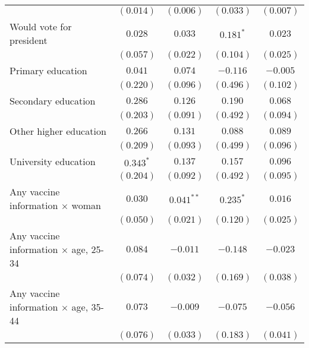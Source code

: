 \begin{table}
\begin{center}
\begin{tabular}{l c c c c}
                                                          & $(0.014)$    & $(0.006)$    & $(0.033)$     & $(0.007)$ \\
Would vote for president                                  & $0.028$      & $0.033$      & $0.181^{*}$   & $0.023$   \\
                                                          & $(0.057)$    & $(0.022)$    & $(0.104)$     & $(0.025)$ \\
Primary education                                         & $0.041$      & $0.074$      & $-0.116$      & $-0.005$  \\
                                                          & $(0.220)$    & $(0.096)$    & $(0.496)$     & $(0.102)$ \\
Secondary education                                       & $0.286$      & $0.126$      & $0.190$       & $0.068$   \\
                                                          & $(0.203)$    & $(0.091)$    & $(0.492)$     & $(0.094)$ \\
Other higher education                                    & $0.266$      & $0.131$      & $0.088$       & $0.089$   \\
                                                          & $(0.209)$    & $(0.093)$    & $(0.499)$     & $(0.096)$ \\
University education                                      & $0.343^{*}$  & $0.137$      & $0.157$       & $0.096$   \\
                                                          & $(0.204)$    & $(0.092)$    & $(0.492)$     & $(0.095)$ \\
Any vaccine information $\times$ woman                    & $0.030$      & $0.041^{**}$ & $0.235^{*}$   & $0.016$   \\
                                                          & $(0.050)$    & $(0.021)$    & $(0.120)$     & $(0.025)$ \\
Any vaccine information $\times$ age, 25-34               & $0.084$      & $-0.011$     & $-0.148$      & $-0.023$  \\
                                                          & $(0.074)$    & $(0.032)$    & $(0.169)$     & $(0.038)$ \\
Any vaccine information $\times$ age, 35-44               & $0.073$      & $-0.009$     & $-0.075$      & $-0.056$  \\
                                                          & $(0.076)$    & $(0.033)$    & $(0.183)$     & $(0.041)$ \\

\end{tabular}
\end{center}
\end{table}
